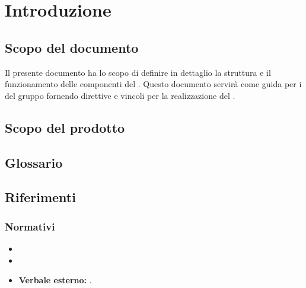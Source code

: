 \section{Introduzione} \label{intro}
\subsection{Scopo del documento}
Il presente documento ha lo scopo di definire in dettaglio la struttura e il funzionamento delle componenti del  \progetto. Questo documento servirà come guida per i \rps del gruppo \gruppo fornendo direttive e vincoli per la realizzazione del .
\subsection{Scopo del prodotto}
\scopoProdotto
\subsection{Glossario}
\descrizioneGlossario
\subsection{Riferimenti}
\subsubsection{Normativi}
\begin{itemize}
\item \normeDiProgetto
\item \analisiDeiRequisiti
\item \textbf{Verbale esterno:} \eV.
\end{itemize}
